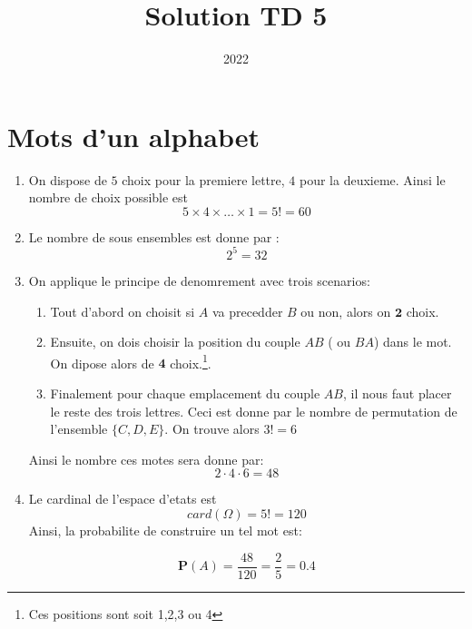 \documentclass[a4paper]{tufte-handout}
\title{Solution TD 5}
\date{2022}
\begin{document}
\maketitle

\renewcommand{\P}{\mathbf{P}}

\section{Mots d'un alphabet}

\begin{enumerate}
  \item On dispose de $5$ choix pour la premiere lettre, $4$ pour la deuxieme.
    Ainsi le nombre de choix possible est 
      \begin{equation*}
       5 \times 4 \times \ldots \times 1  = 5! = 60 
      \end{equation*}
      
    \item Le nombre de sous ensembles est donne par : 
      \begin{equation*}
         2^5 = 32 
      \end{equation*}
    \item On applique le principe de denomrement avec trois scenarios:
      \begin{enumerate}
        \item Tout d'abord on choisit si $A$ va precedder $B$ ou non, alors on
          $\mathbf{2}$ choix.
        \item Ensuite, on dois choisir la position du couple $AB$ ( ou $BA$)
          dans le mot. On dipose alors de $\mathbf{4}$ choix.\footnote{Ces
          positions sont soit 1,2,3 ou 4}.
        \item Finalement pour chaque emplacement du couple $AB$, il nous faut
          placer le reste des trois lettres. Ceci est donne par le nombre de
          permutation de l'ensemble $\{C,D,E\}$. On trouve alors $3! = 6$
      \end{enumerate}
      Ainsi le nombre ces motes sera donne par:
      \begin{equation*}
       2\cdot 4 \cdot 6 = 48 
      \end{equation*}
    \item Le cardinal de l'espace d'etats est 
      $$
      card(\Omega) = 5! = 120
      $$
      Ainsi, la probabilite de construire un tel mot est:

      $$
      \P(A) = \dfrac{48}{120} = \dfrac{2}{5} = 0.4
      $$
\end{enumerate}
\end{document}
